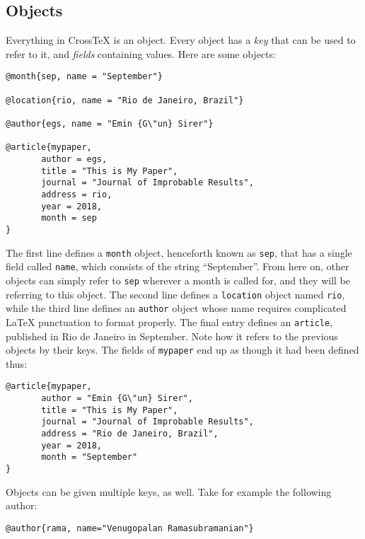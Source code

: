 \documentclass{article}
\newcommand{\XTeX}{Cross\TeX}
\begin{document}
\subsection{Objects}

Everything in \XTeX{} is an object. Every object has a \textit{key} that can be used to refer to it, and \textit{fields} containing values. Here are some objects:

\begin{small}\begin{verbatim}
@month{sep, name = "September"}

@location{rio, name = "Rio de Janeiro, Brazil"}

@author{egs, name = "Emin {G\"un} Sirer"}

@article{mypaper,
	   author = egs,
	   title = "This is My Paper",
	   journal = "Journal of Improbable Results",
	   address = rio,
	   year = 2018,
	   month = sep
}
\end{verbatim}\end{small}

The first line defines a \texttt{month} object, henceforth known as \texttt{sep}, that has a single field called \texttt{name}, which consists of the string ``September''. From here on, other objects can simply refer to \texttt{sep} wherever a month is called for, and they will be referring to this object. The second line defines a \texttt{location} object named \texttt{rio}, while the third line defines an \texttt{author} object whose name requires complicated \LaTeX{} punctuation to format properly. The final entry defines an \texttt{article}, published in Rio de Janeiro in September. Note how it refers to the previous objects by their keys. The fields of \texttt{mypaper} end up as though it had been defined thus:

\begin{small}\begin{verbatim}
@article{mypaper,
	   author = "Emin {G\"un} Sirer",
	   title = "This is My Paper",
	   journal = "Journal of Improbable Results",
	   address = "Rio de Janeiro, Brazil",
	   year = 2018,
	   month = "September"
}
\end{verbatim}\end{small}

Objects can be given multiple keys, as well. Take for example the following author:

\begin{small}\begin{verbatim}
@author{rama, name="Venugopalan Ramasubramanian"}
\end{verbatim}\end{small}
\end{document}
